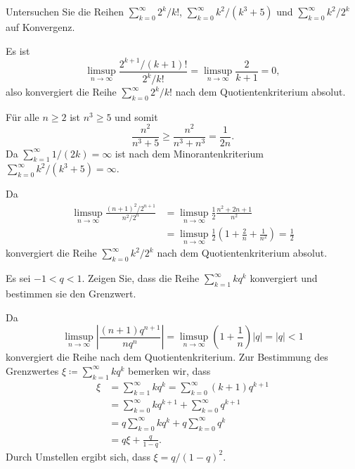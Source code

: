 \documentclass[a4paper,10pt]{article}
\begin{document}
\begin{question}
 Untersuchen Sie die Reihen $\sum_{k=0}^\infty 2^k/k!$, $\sum_{k=0}^\infty k^2/(k^3 + 5)$ und $\sum_{k=0}^\infty k^2/2^k$ auf Konvergenz.
\end{question}
\begin{solution}
 Es ist
 \[
  \limsup_{n \to \infty} \frac{2^{k+1} / (k+1)!}{2^k / k!}
  = \limsup_{n \to \infty}\frac{2}{k+1} = 0,
 \]
 also konvergiert die Reihe $\sum_{k=0}^\infty 2^k/k!$ nach dem Quotientenkriterium absolut.
 
 Für alle $n \geq 2$ ist $n^3 \geq 5$ und somit
 \[
  \frac{n^2}{n^3 + 5} \geq \frac{n^2}{n^3 + n^3} = \frac{1}{2n}.
 \]
 Da $\sum_{k=1}^\infty 1/(2k) = \infty$ ist nach dem Minorantenkriterium \mbox{$\sum_{k=0}^\infty k^2/(k^3 + 5) = \infty$}.
 
 Da
 \begin{align*}
  \limsup_{n \to \infty} \frac{(n+1)^2/2^{n+1}}{n^2/2^n}
  &= \limsup_{n \to \infty} \frac{1}{2} \frac{n^2 + 2n + 1}{n^2} \\
  &= \limsup_{n \to \infty} \frac{1}{2} \left( 1 + \frac{2}{n} + \frac{1}{n^2} \right)
  = \frac{1}{2}
 \end{align*}
 konvergiert die Reihe $\sum_{k=0}^\infty k^2 / 2^k$ nach dem Quotientenkriterium absolut.
\end{solution}


\begin{question}
 Es sei $-1 < q < 1$. Zeigen Sie, dass die Reihe $\sum_{k=1}^\infty k q^k$ konvergiert und bestimmen sie den Grenzwert.
\end{question}
\begin{solution}
 Da
 \[
  \limsup_{n \to \infty} \left| \frac{(n+1)q^{n+1}}{nq^n} \right|
  = \limsup_{n \to \infty} \left(1 + \frac{1}{n}\right) |q|
  = |q|
  < 1
 \]
 konvergiert die Reihe nach dem Quotientenkriterium. Zur Bestimmung des Grenzwertes $\xi \coloneqq \sum_{k=1}^\infty k q^k$ bemerken wir, dass
 \begin{align*}
  \xi
  &= \sum_{k=1}^\infty k q^k
  = \sum_{k=0}^\infty (k+1) q^{k+1} \\
  &= \sum_{k=0}^\infty k q^{k+1} + \sum_{k=0}^\infty q^{k+1} \\
  &= q \sum_{k=0}^\infty k q^k + q \sum_{k=0}^\infty q^k \\
  &= q \xi + \frac{q}{1-q}.
 \end{align*}
 Durch Umstellen ergibt sich, dass $\xi = q/(1-q)^2$.
\end{solution}
\end{document}

